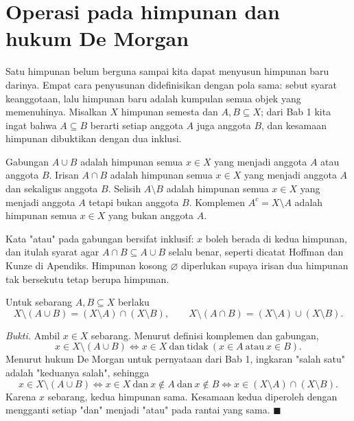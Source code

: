 \section{Operasi pada himpunan dan hukum De Morgan}

Satu himpunan belum berguna sampai kita dapat menyusun himpunan baru darinya. Empat
cara penyusunan didefinisikan dengan pola sama: sebut syarat keanggotaan, lalu himpunan
baru adalah kumpulan semua objek yang memenuhinya. Misalkan $X$ himpunan semesta dan
$A, B \subseteq X$; dari Bab 1 kita ingat bahwa $A \subseteq B$ berarti setiap anggota
$A$ juga anggota $B$, dan kesamaan himpunan dibuktikan dengan dua inklusi.

\begin{definisi}
Gabungan $A \cup B$ adalah himpunan semua $x \in X$ yang menjadi anggota $A$ atau
anggota $B$. Irisan $A \cap B$ adalah himpunan semua $x \in X$ yang menjadi anggota
$A$ dan sekaligus anggota $B$. Selisih $A \setminus B$ adalah himpunan semua
$x \in X$ yang menjadi anggota $A$ tetapi bukan anggota $B$. Komplemen
$A^{c} = X \setminus A$ adalah himpunan semua $x \in X$ yang bukan anggota $A$.
\end{definisi}

Kata "atau" pada gabungan bersifat inklusif: $x$ boleh berada di kedua himpunan, dan
itulah syarat agar $A \cap B \subseteq A \cup B$ selalu benar, seperti dicatat Hoffman
dan Kunze di Apendiks. Himpunan kosong $\varnothing$ diperlukan supaya irisan dua
himpunan tak bersekutu tetap berupa himpunan.

\begin{proposisi}
Untuk sebarang $A, B \subseteq X$ berlaku
\[
  X \setminus (A \cup B) = (X \setminus A) \cap (X \setminus B),
  \qquad
  X \setminus (A \cap B) = (X \setminus A) \cup (X \setminus B).
\]
\end{proposisi}
\par\smallskip\noindent\textit{Bukti.} Ambil $x \in X$ sebarang. Menurut definisi
komplemen dan gabungan,
\[
  x \in X \setminus (A \cup B)
  \iff x \in X \ \text{dan}\ \text{tidak}\ (x \in A \ \text{atau}\ x \in B).
\]
Menurut hukum De Morgan untuk pernyataan dari Bab 1, ingkaran "salah satu" adalah
"keduanya salah", sehingga
\[
  x \in X \setminus (A \cup B)
  \iff x \in X \ \text{dan}\ x \notin A \ \text{dan}\ x \notin B
  \iff x \in (X \setminus A) \cap (X \setminus B).
\]
Karena $x$ sebarang, kedua himpunan sama. Kesamaan kedua diperoleh dengan mengganti
setiap "dan" menjadi "atau" pada rantai yang sama.
\hfill$\blacksquare${\parfillskip=0pt\par}

